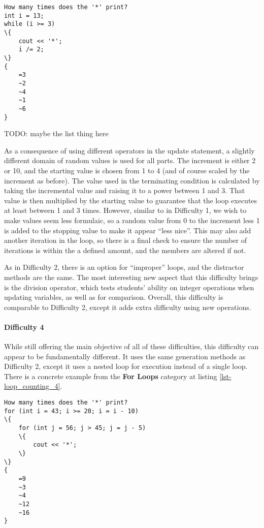\documentclass{article}
\begin{document}
\begin{lstlisting}[caption={Loop Counting Difficulty 3 GIFT Example}, label=lst-loop_counting_d3]
How many times does the '*' print?
int i = 13; 
while (i >= 3) 
\{
	cout << '*'; 
	i /= 2;
\}
{
	=3
	~2
	~4
	~1
	~6
}
\end{lstlisting}


TODO: maybe the list thing here 

As a consequence of using different operators in the update statement, a slightly different domain of random values is used for all parts. The increment is either 2 or 10, and the starting value 
is chosen from 1 to 4 (and of course scaled by the increment as before). The value used in the terminating condition is calculated by taking the incremental value and raising it to a power 
between 1 and 3. That value is then multiplied by the starting value to guarantee that the loop executes at least between 1 and 3 times. However, similar to in Difficulty 1, we wish to make
values seem less formulaic, so a random value from 0 to the increment less 1 is added to the stopping value to make it appear ``less nice''. This may also add another iteration in the loop,
so there is a final check to ensure the number of iterations is within the a defined amount, and the members are altered if not. 

As in Difficulty 2, there is an option for ``improper'' loops, and the distractor methods are the same. The most interesting new aspect that this difficulty brings is the division operator, which tests students' ability on integer operations
when updating variables, as well as for comparison. Overall, this difficulty is comparable to Difficulty 2, except it adds extra difficulty using new operations. 

\paragraph{Difficulty 4} \hfill \par 
While still offering the main objective of all of these difficulties, this difficulty can appear to be fundamentally different. It uses the same generation methods as Difficulty 2, except it uses 
a nested loop for execution instead of a single loop. There is a concrete example from the \textbf{For Loops} category at listing \ref{lst-loop_counting_4}.

\begin{lstlisting}[float, caption={Loop Counting Difficulty 4 GIFT Example}, label=lst-loop_counting_4]
How many times does the '*' print? 
for (int i = 43; i >= 20; i = i - 10) 
\{ 
	for (int j = 56; j > 45; j = j - 5) 
	\{ 
		cout << '*'; 
	\} 
\}
{
	=9
	~3
	~4
	~12
	~16
}
\end{lstlisting}
\end{document}
